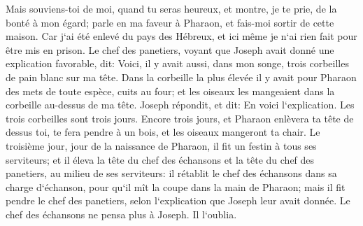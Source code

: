 \verse Mais souviens-toi de moi, quand tu seras heureux, et montre, je te prie, de la bonté à mon égard; parle en ma faveur à Pharaon, et fais-moi sortir de cette maison. 
\verse Car j`ai été enlevé du pays des Hébreux, et ici même je n`ai rien fait pour être mis en prison. 
\verse Le chef des panetiers, voyant que Joseph avait donné une explication favorable, dit: Voici, il y avait aussi, dans mon songe, trois corbeilles de pain blanc sur ma tête. 
\verse Dans la corbeille la plus élevée il y avait pour Pharaon des mets de toute espèce, cuits au four; et les oiseaux les mangeaient dans la corbeille au-dessus de ma tête. 
\verse Joseph répondit, et dit: En voici l`explication. Les trois corbeilles sont trois jours. 
\verse Encore trois jours, et Pharaon enlèvera ta tête de dessus toi, te fera pendre à un bois, et les oiseaux mangeront ta chair. 
\verse Le troisième jour, jour de la naissance de Pharaon, il fit un festin à tous ses serviteurs; et il éleva la tête du chef des échansons et la tête du chef des panetiers, au milieu de ses serviteurs: 
\verse il rétablit le chef des échansons dans sa charge d`échanson, pour qu`il mît la coupe dans la main de Pharaon; 
\verse mais il fit pendre le chef des panetiers, selon l`explication que Joseph leur avait donnée. 
\verse Le chef des échansons ne pensa plus à Joseph. Il l`oublia. 

